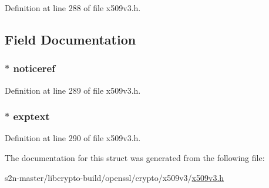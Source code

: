 Definition at line 288 of file x509v3.\+h.



\subsection{Field Documentation}
\subsubsection[{\texorpdfstring{noticeref}{noticeref}}]{ $\ast$ noticeref}\hypertarget{struct_u_s_e_r_n_o_t_i_c_e__st_ae2c146d24666664bcbb7e29641f8a7c7}{}\label{struct_u_s_e_r_n_o_t_i_c_e__st_ae2c146d24666664bcbb7e29641f8a7c7}


Definition at line 289 of file x509v3.\+h.

\subsubsection[{\texorpdfstring{exptext}{exptext}}]{ $\ast$ exptext}\hypertarget{struct_u_s_e_r_n_o_t_i_c_e__st_a6e05309358f492504592300c6d8afdb0}{}\label{struct_u_s_e_r_n_o_t_i_c_e__st_a6e05309358f492504592300c6d8afdb0}


Definition at line 290 of file x509v3.\+h.



The documentation for this struct was generated from the following file\+:\begin{DoxyCompactItemize}
\item 
s2n-\/master/libcrypto-\/build/openssl/crypto/x509v3/\hyperlink{crypto_2x509v3_2x509v3_8h}{x509v3.\+h}\end{DoxyCompactItemize}
